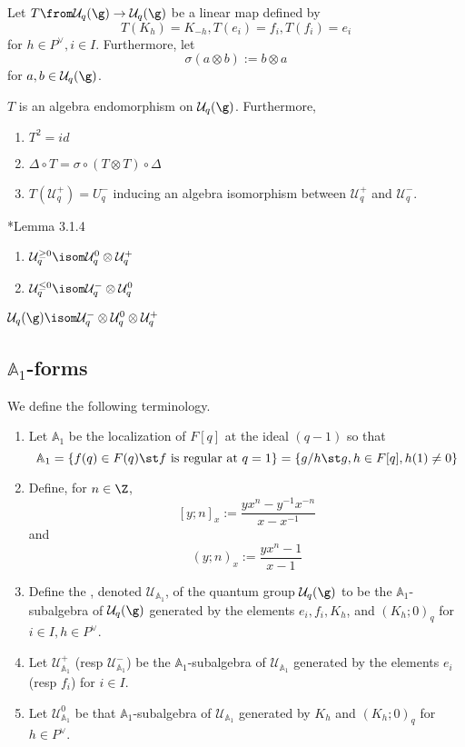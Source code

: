\documentclass[11pt,leqno,oneside]{amsart}
\numberwithin{thm}{section}
\newcommand{\weightlattice}{P}
\newcommand{\U}{\mathcal{U}}
\newcommand{\A}{\mathbb{A}}
\begin{document}
\begin{defn}
  Let \(T \from \U_q(\g) \to \U_q(\g)\) be a linear map defined by \[
    T(K_h) = K_{-h}, T(e_i) = f_i, T(f_i) = e_i
  \]
  for \(h \in \weightlattice^\vee, i \in I\). Furthermore, let \[
    \sigma(a \otimes b) := b \otimes a
  \]
  for \(a,b \in \U_q(\g)\).
\end{defn}
\begin{prop}
  \(T\) is an algebra endomorphism on \(\U_q(\g)\). Furthermore,
  \begin{enumerate}
  \item \(T^2 = id\)
  \item \(\Delta \circ T = \sigma \circ (T \otimes T) \circ \Delta\)
  \item \(T(\U_q^+) = U_q^-\) inducing an algebra isomorphism between
    \(\U_q^+\) and \(\U_q^-\).
  \end{enumerate}
\end{prop}
\begin{lem}
  \cite{hong-kang}*{Lemma 3.1.4}
  \begin{enumerate}
  \item \(\U_q^{\geq 0} \isom \U_q^0 \otimes \U_q^+\)
  \item \(\U_q^{\leq 0} \isom \U_q^- \otimes \U_q^0\)
  \end{enumerate}
\end{lem}
\begin{thm}
  \(\U_q(\g) \isom \U_q^- \otimes \U_q^0 \otimes \U_q^+\)
\end{thm}
\subsection{\(\A_1\)-forms}
\begin{defn}
  We define the following terminology.
  \begin{enumerate}
  \item  Let \(\A_1\) be the localization of \(F[q]\) at the ideal \((q-1)\)
  so that \[
    \A_1 = \{f(q) \in F(q) \st f \text{ is regular at }q=1\} = \{g/h
    \st g,h \in F[q], h(1) \neq 0\}
  \]
  \item Define, for \(n \in \Z\), \[
    [y;n]_x := \frac{yx^n-y^{-1}x^{-n}}{x-x^{-1}}
  \]
  and \[
    (y;n)_x := \frac{yx^n-1}{x-1}
  \]
  \item Define the \de{\(\A_1\)-form}, denoted \(\U_{\A_1}\), of the
    quantum group \(\U_q(\g)\) to be the \(\A_1\)-subalgebra of
    \(\U_q(\g)\) generated by the elements \(e_i, f_i, K_h\), and
    \((K_h;0)_q\) for \(i \in I, h \in \weightlattice^\vee\).
  \item Let \(\U_{\A_1}^+\) (resp \(\U_{\A_1}^-\)) be the
    \(\A_1\)-subalgebra of \(\U_{\A_1}\) generated by the elements
    \(e_i\) (resp \(f_i\)) for \(i \in I\).
  \item Let \(\U_{\A_1}^0\) be that \(\A_1\)-subalgebra of
    \(\U_{\A_1}\) generated by \(K_h\) and \((K_h;0)_q\) for \(h \in
    \weightlattice^\vee\). 
  \end{enumerate}
\end{defn}
\end{document}
